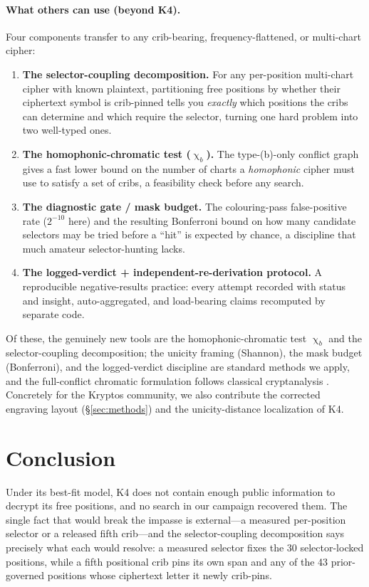 \documentclass[11pt]{article}
\theoremstyle{plain}
\theoremstyle{definition}
\newcommand{\K}{\textsf{K4}}
\DeclareMathOperator{\chrom}{\chi}
\begin{document}
\paragraph{What others can use (beyond \K{}).} Four components transfer to any
crib-bearing, frequency-flattened, or multi-chart cipher:
\begin{enumerate}[leftmargin=1.6em,itemsep=1pt,label=(\arabic*)]
\item \textbf{The selector-coupling decomposition.} For any per-position
multi-chart cipher with known plaintext, partitioning free positions by whether their
ciphertext symbol is crib-pinned tells you \emph{exactly} which positions the cribs
can determine and which require the selector, turning one hard problem into two
well-typed ones.
\item \textbf{The homophonic-chromatic test ($\chrom_b$).} The type-(b)-only
conflict graph gives a fast lower bound on the number of charts a \emph{homophonic}
cipher must use to satisfy a set of cribs, a feasibility check before any search.
\item \textbf{The diagnostic gate / mask budget.} The colouring-pass false-positive
rate ($2^{-10}$ here) and the resulting Bonferroni bound on how many candidate
selectors may be tried before a ``hit'' is expected by chance, a discipline that
much amateur selector-hunting lacks.
\item \textbf{The logged-verdict + independent-re-derivation protocol.} A
reproducible negative-results practice: every attempt recorded with status and
insight, auto-aggregated, and load-bearing claims recomputed by separate code.
\end{enumerate}
Of these, the genuinely new tools are the homophonic-chromatic test $\chrom_b$ and
the selector-coupling decomposition; the unicity framing (Shannon), the mask budget
(Bonferroni), and the logged-verdict discipline are standard methods we apply, and
the full-conflict chromatic formulation follows classical cryptanalysis
\cite{bauer2007}. Concretely for the Kryptos community, we also contribute the
corrected engraving layout (\S\ref{sec:methods}) and the unicity-distance
localization of \K{}.

\section{Conclusion}\label{sec:conc}

Under its best-fit model, \K{} does not contain enough public information to decrypt
its free positions, and no search in our campaign recovered them. The single fact that
would break the impasse is external---a measured per-position selector or a released
fifth crib---and the selector-coupling decomposition says precisely what each would
resolve: a measured selector fixes the 30 selector-locked positions, while a fifth
positional crib pins its own span and any of the 43 prior-governed positions whose
ciphertext letter it newly crib-pins.
\end{document}
